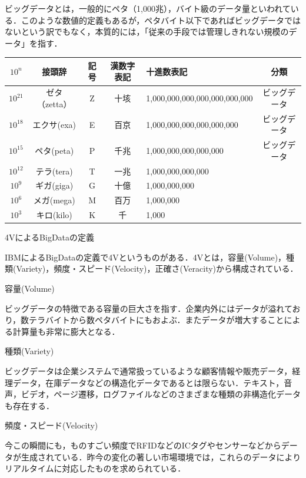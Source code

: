 ビッグデータとは，一般的にペタ（1,000兆），バイト級のデータ量といわれている．このような数値的定義もあるが，ペタバイト以下であればビッグデータではないという訳でもなく，本質的には，「従来の手段では管理しきれない規模のデータ」を指す．

\begin{table}[H]
  \begin{tabular}{|c|c|c|c|l|c|} \hline
    $10^n$ & 接頭辞 & 記号 & 漢数字表記 & 十進数表記 & 分類 \\ \hline
    $10^21$ & ゼタ（zetta） & Z & 十垓 & 1,000,000,000,000,000,000,000 & ビッグデータ \\ \hline
    $10^18$ & エクサ(exa) & E & 百京 & 1,000,000,000,000,000,000 & ビッグデータ \\ \hline
    $10^15$ & ペタ(peta) & P & 千兆 & 1,000,000,000,000,000 & ビッグデータ \\ \hline
    $10^12$ & テラ(tera) & T & 一兆 & 1,000,000,000,000 &  \\ \hline
    $10^9$ & ギガ(giga) & G & 十億 & 1,000,000,000 &  \\ \hline
    $10^6$ & メガ(mega) & M & 百万 & 1,000,000 &  \\ \hline
    $10^3$ & キロ(kilo) & K & 千 & 1,000 &  \\ \hline
  \end{tabular}
\end{table}




4VによるBigDataの定義

IBMによるBigDataの定義で4Vというものがある．4Vとは，容量(Volume)，種類(Variety)，頻度・スピード(Velocity)，正確さ(Veracity)から構成されている．



容量(Volume)

ビッグデータの特徴である容量の巨大さを指す．企業内外にはデータが溢れており，数テラバイトから数ペタバイトにもおよぶ．またデータが増大することによる計算量も非常に膨大となる．



種類(Variety)

ビッグデータは企業システムで通常扱っているような顧客情報や販売データ，経理データ，在庫データなどの構造化データであるとは限らない．テキスト，音声，ビデオ，ページ遷移，ログファイルなどのさまざまな種類の非構造化データも存在する．



頻度・スピード(Velocity)

今この瞬間にも，ものすごい頻度でRFIDなどのICタグやセンサーなどからデータが生成されている．昨今の変化の著しい市場環境では，これらのデータによりリアルタイムに対応したものを求められている．



